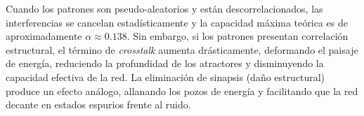 Cuando los patrones son pseudo-aleatorios y están descorrelacionados, las interferencias se cancelan estadísticamente y la capacidad máxima teórica es de aproximadamente $\alpha \approx 0.138$. Sin embargo, si los patrones presentan correlación estructural, el término de \textit{crosstalk} aumenta drásticamente, deformando el paisaje de energía, reduciendo la profundidad de los atractores y disminuyendo la capacidad efectiva de la red. La eliminación de sinapsis (daño estructural) produce un efecto análogo, allanando los pozos de energía y facilitando que la red decante en estados espurios frente al ruido.